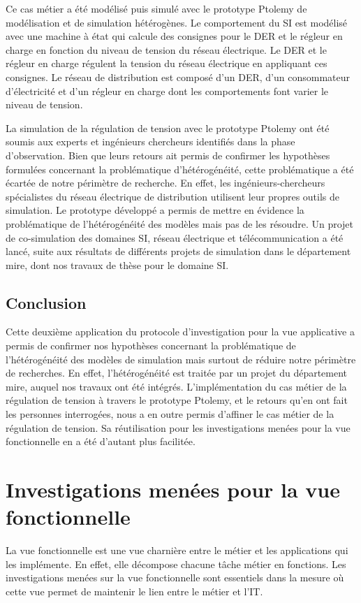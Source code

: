 		Ce cas métier a été modélisé puis simulé avec le prototype Ptolemy de modélisation et de simulation hétérogènes. Le comportement du SI est modélisé avec une machine à état qui calcule des consignes pour le DER et le régleur en charge en fonction du niveau de tension du réseau électrique. Le DER et le régleur en charge  régulent la tension du réseau électrique en appliquant ces consignes. Le réseau de distribution est composé d'un DER, d'un consommateur d'électricité et d'un régleur en charge dont les comportements font varier le niveau de tension.
		
		La simulation de la régulation de tension avec le prototype Ptolemy ont été soumis aux experts et ingénieurs chercheurs identifiés dans la phase d'observation. Bien que leurs retours ait permis de confirmer les hypothèses formulées concernant la problématique d'hétérogénéité, cette problématique a été écartée de notre périmètre de recherche. En effet, les ingénieurs-chercheurs spécialistes du réseau électrique de distribution utilisent leur propres outils de simulation. Le prototype développé a permis de mettre en évidence la problématique de l'hétérogénéité des modèles mais pas de les résoudre. Un projet de co-simulation des domaines SI, réseau électrique et télécommunication a été lancé, suite aux résultats de différents projets de simulation dans le département \gls{mire}, dont nos travaux de thèse pour le domaine SI.
		
		  
				\subsection{Conclusion}
		Cette deuxième application du protocole d'investigation pour la vue applicative a permis de confirmer nos hypothèses concernant la problématique de l'hétérogénéité des modèles de simulation mais surtout de réduire notre périmètre de recherches. En effet, l'hétérogénéité est traitée par un projet du département \gls{mire}, auquel nos travaux ont été intégrés. L'implémentation du cas métier de la régulation de tension à travers le prototype Ptolemy, et le retours qu'en ont fait les personnes interrogées, nous a en outre permis d'affiner le cas métier de la régulation de tension. Sa réutilisation pour les investigations menées pour la vue fonctionnelle en a été d'autant plus facilitée.   
	
		\section{Investigations menées pour la vue fonctionnelle} 
		La vue fonctionnelle est une vue charnière entre le métier et les applications qui les implémente. En effet, elle décompose chacune tâche métier en fonctions. Les investigations menées sur la vue fonctionnelle sont essentiels dans la mesure où cette vue permet de maintenir le lien entre le métier et l'IT. 
